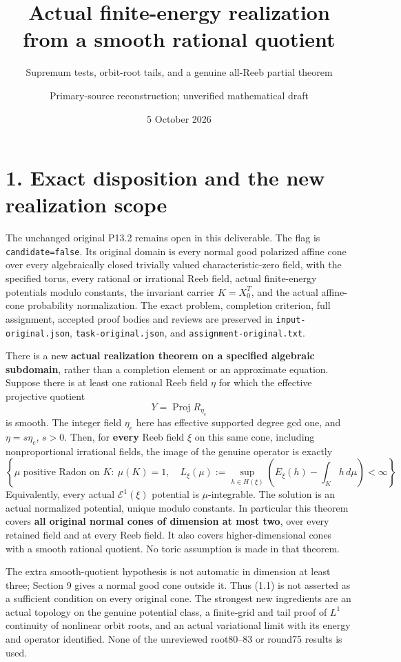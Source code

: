 \documentclass[
  10pt,
]{article}
\title{Actual finite-energy realization from a smooth rational quotient}
\subtitle{Supremum tests, orbit-root tails, and a genuine all-Reeb
partial theorem}
\author{Primary-source reconstruction; unverified mathematical draft}
\date{5 October 2026}
\begin{document}
\maketitle

\section{1. Exact disposition and the new realization
scope}\label{exact-disposition-and-the-new-realization-scope}

The unchanged original P13.2 remains open in this deliverable. The flag
is \texttt{candidate=false}. Its original domain is every normal good
polarized affine cone over every algebraically closed trivially valued
characteristic-zero field, with the specified torus, every rational or
irrational Reeb field, actual finite-energy potentials modulo constants,
the invariant carrier \(K=X_0^T\), and the actual affine-cone
probability normalization. The exact problem, completion criterion, full
assignment, accepted proof bodies and reviews are preserved in
\texttt{input-original.json}, \texttt{task-original.json}, and
\texttt{assignment-original.txt}.

There is a new \textbf{actual realization theorem on a specified
algebraic subdomain}, rather than a completion element or an approximate
equation. Suppose there is at least one rational Reeb field \(\eta\) for
which the effective projective quotient \[
Y=\operatorname{Proj}R_{\eta_e}
\] is smooth. The integer field \(\eta_e\) here has effective supported
degree gcd one, and \(\eta=s\eta_e\), \(s>0\). Then, for \textbf{every}
Reeb field \(\xi\) on this same cone, including nonproportional
irrational fields, the image of the genuine operator is exactly \[
\left\{\mu\text{ positive Radon on }K:\ \mu(K)=1,\quad
L_\xi(\mu):=\sup_{h\in H(\xi)}\left(E_\xi(h)-\int_Kh\,d\mu\right)<\infty\right\}.                 \tag{1.1}
\] Equivalently, every actual \(\mathcal E^1(\xi)\) potential is
\(\mu\)-integrable. The solution is an actual normalized potential,
unique modulo constants. In particular this theorem covers \textbf{all
original normal cones of dimension at most two}, over every retained
field and at every Reeb field. It also covers higher-dimensional cones
with a smooth rational quotient. No toric assumption is made in that
theorem.

The extra smooth-quotient hypothesis is not automatic in dimension at
least three; Section 9 gives a normal good cone outside it. Thus (1.1)
is not asserted as a sufficient condition on every original cone. The
strongest new ingredients are an actual topology on the genuine
potential class, a finite-grid and tail proof of \(L^1\) continuity of
nonlinear orbit roots, and an actual variational limit with its energy
and operator identified. None of the unreviewed root80--83 or round75
results is used.
\end{document}
